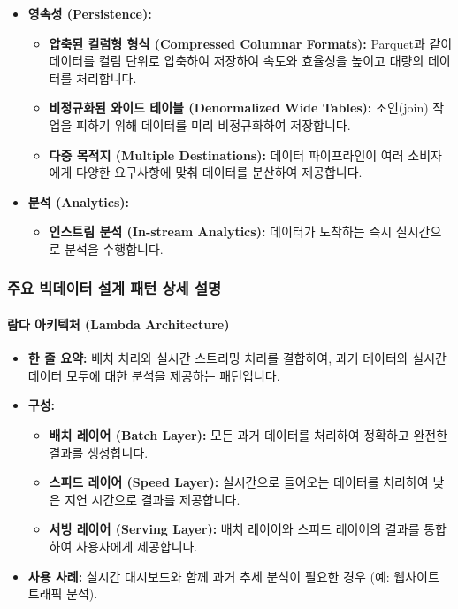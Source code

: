 \documentclass[11pt,a4paper]{article}
\theoremstyle{definition}
\begin{document}
\begin{itemize}
\begin{itemize}
    \end{itemize}
    \item \textbf{영속성 (Persistence):}
    \begin{itemize}
        \item \textbf{압축된 컬럼형 형식 (Compressed Columnar Formats):} Parquet과 같이 데이터를 컬럼 단위로 압축하여 저장하여 속도와 효율성을 높이고 대량의 데이터를 처리합니다.
        \item \textbf{비정규화된 와이드 테이블 (Denormalized Wide Tables):} 조인(join) 작업을 피하기 위해 데이터를 미리 비정규화하여 저장합니다.
        \item \textbf{다중 목적지 (Multiple Destinations):} 데이터 파이프라인이 여러 소비자에게 다양한 요구사항에 맞춰 데이터를 분산하여 제공합니다.
    \end{itemize}
    \item \textbf{분석 (Analytics):}
    \begin{itemize}
        \item \textbf{인스트림 분석 (In-stream Analytics):} 데이터가 도착하는 즉시 실시간으로 분석을 수행합니다.
    \end{itemize}
\end{itemize}

\subsubsection{주요 빅데이터 설계 패턴 상세 설명}

\paragraph{람다 아키텍처 (Lambda Architecture)}
\begin{itemize}
    \item \textbf{한 줄 요약:} 배치 처리와 실시간 스트리밍 처리를 결합하여, 과거 데이터와 실시간 데이터 모두에 대한 분석을 제공하는 패턴입니다.
    \item \textbf{구성:}
    \begin{itemize}
        \item \textbf{배치 레이어 (Batch Layer):} 모든 과거 데이터를 처리하여 정확하고 완전한 결과를 생성합니다.
        \item \textbf{스피드 레이어 (Speed Layer):} 실시간으로 들어오는 데이터를 처리하여 낮은 지연 시간으로 결과를 제공합니다.
        \item \textbf{서빙 레이어 (Serving Layer):} 배치 레이어와 스피드 레이어의 결과를 통합하여 사용자에게 제공합니다.
    \end{itemize}
    \item \textbf{사용 사례:} 실시간 대시보드와 함께 과거 추세 분석이 필요한 경우 (예: 웹사이트 트래픽 분석).
\end{itemize}
\end{document}
